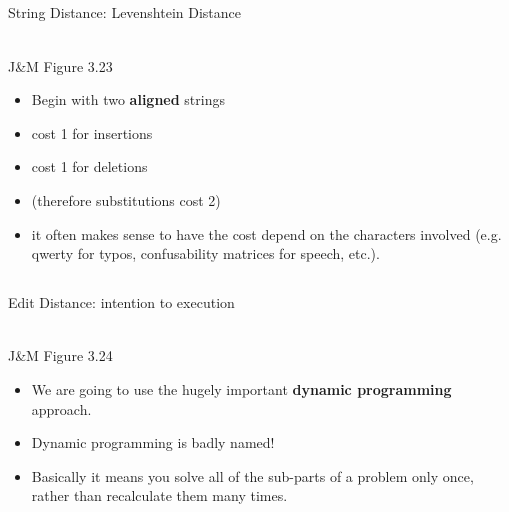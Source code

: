 \documentclass[9pt,xcolor=pdftex,dvipsnames,table]{beamer}
\begin{document}
\subsection{}
\begin{frame}{String Distance: Levenshtein Distance}
\begin{center}
	\\
	{\large J\&M Figure 3.23}\\
\end{center}

\begin{itemize}
     \item Begin with two \textbf{aligned} strings
     \item cost 1 for insertions
     \item cost 1 for deletions
     \item (therefore substitutions cost 2)\pause
     \item it often makes sense to have the cost depend on the characters involved (e.g. qwerty for typos, confusability matrices for speech, etc.).
\end{itemize}
\end{frame}

\subsection{}
\begin{frame}{Edit Distance: intention to execution}
\begin{center}
	\\
	{\large J\&M Figure 3.24}\\
\end{center}

\begin{itemize}
     \item We are going to use the hugely important \textbf{dynamic programming} approach.
     \item Dynamic programming is badly named!
     \item Basically it means you solve all of the sub-parts of a problem only once, rather than recalculate them many times.
\end{itemize}

\end{frame}
\end{document}
